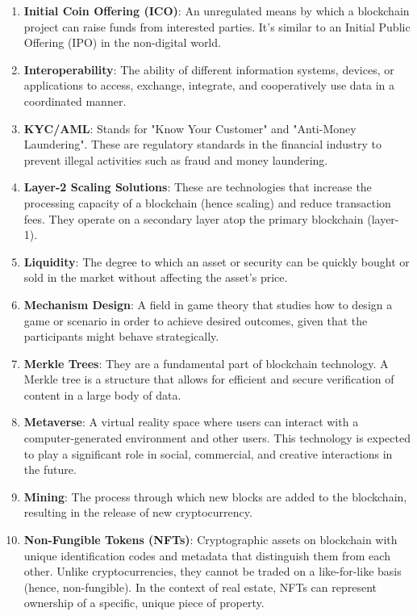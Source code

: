 \begin{enumerate}
    \item \textbf{Initial Coin Offering (ICO)}: An unregulated means by which a blockchain project can raise funds from interested parties. It's similar to an Initial Public Offering (IPO) in the non-digital world.

    \item \textbf{Interoperability}: The ability of different information systems, devices, or applications to access, exchange, integrate, and cooperatively use data in a coordinated manner.

    \item \textbf{KYC/AML}: Stands for "Know Your Customer" and "Anti-Money Laundering". These are regulatory standards in the financial industry to prevent illegal activities such as fraud and money laundering.

    \item \textbf{Layer-2 Scaling Solutions}: These are technologies that increase the processing capacity of a blockchain (hence scaling) and reduce transaction fees. They operate on a secondary layer atop the primary blockchain (layer-1).

    \item \textbf{Liquidity}: The degree to which an asset or security can be quickly bought or sold in the market without affecting the asset's price.

    \item \textbf{Mechanism Design}: A field in game theory that studies how to design a game or scenario in order to achieve desired outcomes, given that the participants might behave strategically. 

    \item \textbf{Merkle Trees}: They are a fundamental part of blockchain technology. A Merkle tree is a structure that allows for efficient and secure verification of content in a large body of data.

    \item \textbf{Metaverse}: A virtual reality space where users can interact with a computer-generated environment and other users. This technology is expected to play a significant role in social, commercial, and creative interactions in the future.

    \item \textbf{Mining}: The process through which new blocks are added to the blockchain, resulting in the release of new cryptocurrency. 

    \item \textbf{Non-Fungible Tokens (NFTs)}: Cryptographic assets on blockchain with unique identification codes and metadata that distinguish them from each other. Unlike cryptocurrencies, they cannot be traded on a like-for-like basis (hence, non-fungible). In the context of real estate, NFTs can represent ownership of a specific, unique piece of property.


\end{enumerate}
